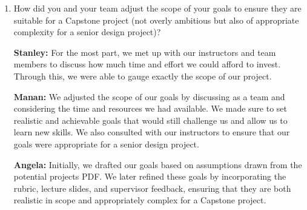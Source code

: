 \documentclass{article}
\begin{document}
\begin{enumerate}
    \item How did you and your team adjust the scope of your goals to ensure
    they are suitable for a Capstone project (not overly ambitious but also of
    appropriate complexity for a senior design project)?

\textbf{Stanley:} For the most part, we met up with our instructors and team members to discuss how much time and effort we could afford to invest. Through this, we were able to gauge exactly the scope of our project.  

\textbf{Manan:} We adjusted the scope of our goals by discussing as a team and considering the time and resources we had available. We made sure to set realistic and achievable goals that would still challenge us and allow us to learn new skills. We also consulted with our instructors to ensure that our goals were appropriate for a senior design project.

\textbf{Angela:} Initially, we drafted our goals based on assumptions drawn from the potential projects PDF. We later refined these goals by incorporating the rubric, lecture slides, and supervisor feedback, ensuring that they are both realistic in scope and appropriately complex for a Capstone project.

\end{enumerate}  
\end{document}
